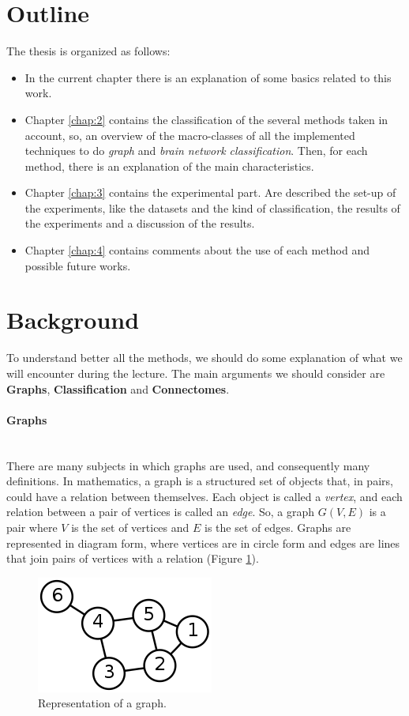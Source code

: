 \section{Outline}
The thesis is organized as follows:

\begin{itemize}
	\item In the current chapter there is an explanation of some basics related to this work.
	\item Chapter \ref{chap:2} contains the classification of the several methods taken in account, so, an overview of the macro-classes of all the implemented techniques to do \emph{graph} and \emph{brain network classification}. 
	Then, for each method, there is an explanation of the main characteristics.
	\item Chapter \ref{chap:3} contains the experimental part. Are described the set-up of the experiments, like the datasets and the kind of classification, the results of the experiments and a discussion of the results.
	\item Chapter \ref{chap:4} contains comments about the use of each method and possible future works. 
\end{itemize}

\section{Background}
To understand better all the methods, we should do some explanation of what we will encounter during the lecture. The main arguments we should consider are \textbf{Graphs}, \textbf{Classification} and \textbf{Connectomes}.

\paragraph{Graphs} \
\\
There are many subjects in which graphs are used, and consequently many definitions. In mathematics, a graph is a structured set of objects that, in pairs, could have a relation between themselves. Each object is called a \textit{vertex}, and each relation between a pair of vertices is called an \textit{edge}. So, a graph $ G(V,E) $ is a pair where $ V $ is the set of vertices and $ E $ is the set of edges. Graphs are represented in diagram form, where vertices are in circle form and edges are lines that join pairs of vertices with a relation (Figure \ref{fig:diagram}).
\begin{figure}[htbp]
	\centering
	\includegraphics[scale=0.5]{Immagini/220px-6n-graf.svg.png}
	\caption{Representation of a graph.}
	\label{fig:diagram}
\end{figure}

